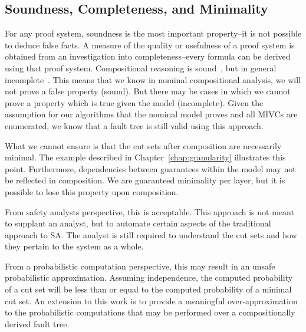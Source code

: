 \subsection{Soundness, Completeness, and Minimality}
For any proof system, soundness is the most important property--it is not possible to deduce false facts. A measure of the quality or usefulness of a proof system is obtained from an investigation into completeness--every formula can be derived using that proof system. Compositional reasoning is sound~\cite{CompTechReport}, but in general incomplete~\cite{namjoshi2010completeness}. This means that we know in nominal compositional analysis, we will not prove a false property (sound). But there may be cases in which we cannot prove a property which is true given the model (incomplete). Given the assumption for our algorithms that the nominal model proves and all MIVCs are enumerated, we know that a fault tree is still valid using this approach. 

What we cannot ensure is that the cut sets after composition are necessarily minimal. The example described in Chapter~\ref{chap:granularity} illustrates this point. Furthermore, dependencies between guarantees within the model may not be reflected in composition. We are guaranteed minimality per layer, but it is possible to lose this property upon composition. 

From safety analysts perspective, this is acceptable. This approach is not meant to supplant an analyst, but to automate certain aspects of the traditional approach to SA. The analyst is still required to understand the cut sets and how they pertain to the system as a whole. 

From a probabilistic computation perspective, this may result in an unsafe probabilistic approximation. Assuming independence, the computed probability of a cut set will be less than or equal to the computed probability of a minimal cut set. An extension to this work is to provide a meaningful over-approximation to the probabilistic computations that may be performed over a compositionally derived fault tree. 










